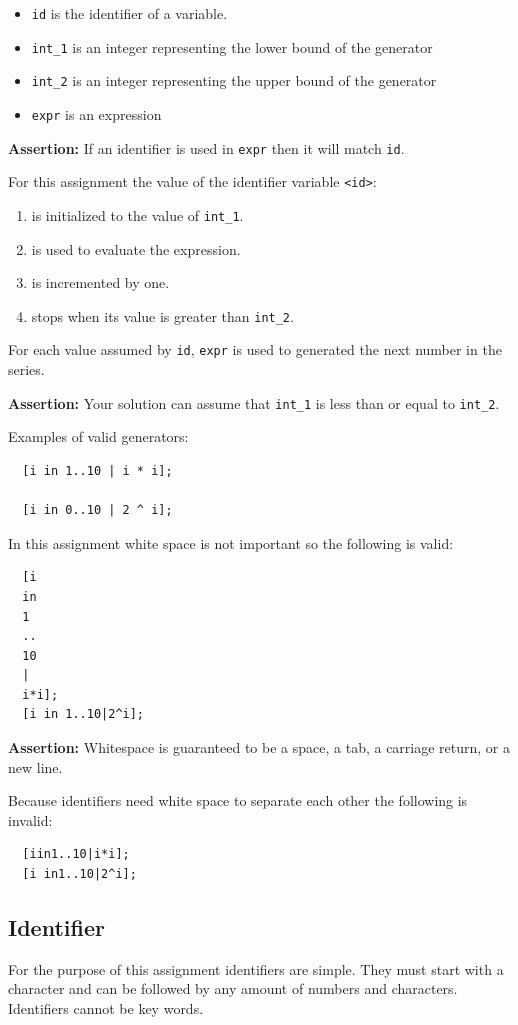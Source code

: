 \documentclass{article}
\newcommand{\code}[1]{\texttt{\textmd{#1}}}
\newcommand{\assertion}[1]{\textbf{Assertion: }#1}
\begin{document}
\begin{itemize}
  \item \code{id} is the identifier of a variable.
  \item{\code{int\_1}} is an integer representing the lower bound of the generator
  \item{\code{int\_2}} is an integer representing the upper bound of the generator
  \item{\code{expr}} is an expression
\end{itemize}

\assertion{If an identifier is used in \code{expr} then it will match \code{id}.}

For this assignment the value of the identifier variable \code{<id>}:
\begin{enumerate}
  \item is initialized to the value of \code{int\_1}.
  \item is used to evaluate the expression.
  \item is incremented by one.
  \item stops when its value is greater than \code{int\_2}.
\end{enumerate}
For each value assumed by \code{id}, \code{expr} is used to generated the next number in the
series.

\assertion{Your solution can assume that \code{int\_1} is less than or equal to
\code{int\_2}.}

Examples of valid generators:
\begin{lstlisting}
  [i in 1..10 | i * i];

  [i in 0..10 | 2 ^ i];
\end{lstlisting}

In this assignment white space is not important so the following is valid:

\begin{lstlisting}
  [i
  in
  1
  ..
  10
  |
  i*i];
  [i in 1..10|2^i];
\end{lstlisting}
\assertion{Whitespace is guaranteed to be a space, a tab, a carriage return, or a new
line.}

Because identifiers need white space to separate each other the following is invalid:
\begin{lstlisting}
  [iin1..10|i*i];
  [i in1..10|2^i];
\end{lstlisting}

\subsection{Identifier}
For the purpose of this assignment identifiers are simple. They must start with a character and
can be followed by any amount of numbers and characters. Identifiers cannot be key words.
\end{document}
